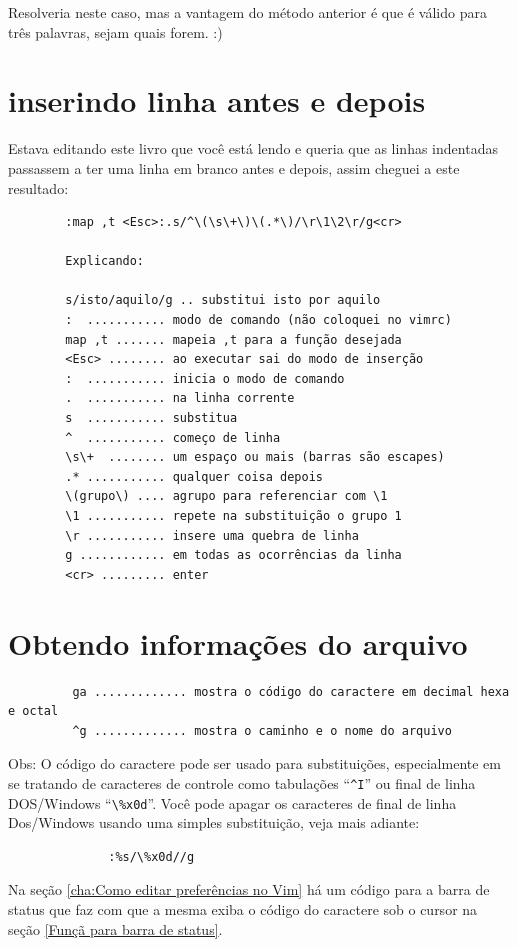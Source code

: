 \documentclass[10pt,a4paper,openany]{book}
\begin{document}
Resolveria neste caso, mas a vantagem do método anterior é que
é válido para três palavras, sejam quais forem. :)

\section{inserindo linha antes e depois}
Estava editando este livro que você está lendo
e queria que as linhas indentadas passassem a ter
uma linha em branco antes e depois, assim cheguei
a este resultado:
\begin{verbatim}
		:map ,t <Esc>:.s/^\(\s\+\)\(.*\)/\r\1\2\r/g<cr>

		Explicando:

		s/isto/aquilo/g .. substitui isto por aquilo
		:  ........... modo de comando (não coloquei no vimrc)
		map ,t ....... mapeia ,t para a função desejada
		<Esc> ........ ao executar sai do modo de inserção
		:  ........... inicia o modo de comando
		.  ........... na linha corrente
		s  ........... substitua
		^  ........... começo de linha
		\s\+  ........ um espaço ou mais (barras são escapes)
		.* ........... qualquer coisa depois
		\(grupo\) .... agrupo para referenciar com \1
		\1 ........... repete na substituição o grupo 1
		\r ........... insere uma quebra de linha
		g ............ em todas as ocorrências da linha
		<cr> ......... enter
\end{verbatim}


\section{Obtendo informações do arquivo }

\begin{verbatim}
		 ga ............. mostra o código do caractere em decimal hexa e octal
		 ^g ............. mostra o caminho e o nome do arquivo
\end{verbatim}

Obs: O código do caractere pode ser usado para substituições,
especialmente em se tratando de caracteres de controle como tabulações
``\verb|^I|'' ou final de linha DOS/Windows ``\verb|\%x0d|''. Você pode apagar os
caracteres de final de linha Dos/Windows usando uma simples
substituição, veja mais adiante:

\begin{verbatim}
			  :%s/\%x0d//g
\end{verbatim}

Na seção \ref{cha:Como editar preferências no Vim} há um código para a barra de
status que faz com que a mesma exiba o código do caractere sob o cursor na
seção \ref{Funçã para barra de status}.
\end{document}

